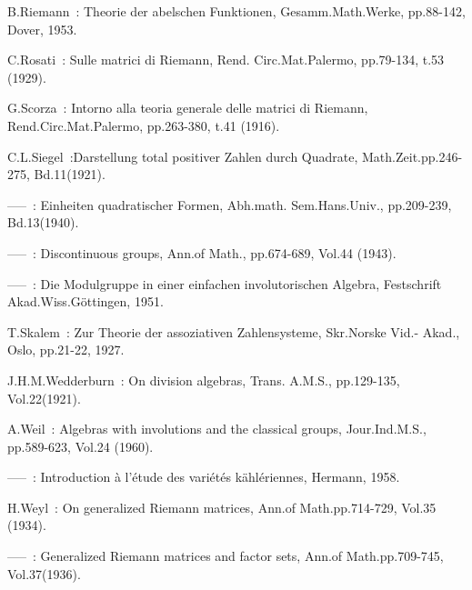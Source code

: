 \begin{thebibliography}{99}
 B.\@ Riemann~: Theorie der abelschen Funktionen,
  Gesamm.\@ Math.\@ Werke, pp.88-142, Dover, 1953.

 C.Rosati~: Sulle matrici di Riemann, Rend.\@
  Circ.\@ Mat.\@ Palermo, pp.79-134, t.53 (1929).

 G.\@ Scorza~: Intorno alla teoria generale delle
  matrici di Riemann, Rend.\@ Circ.\@ Mat.\@ Palermo, pp.263-380, t.41
  (1916). 

 C.L.\@ Siegel~:\pageoriginale Darstellung total positiver
  Zahlen durch Quadrate, Math.\@ Zeit.\@ pp.246-275, Bd.11(1921).

 -----~: Einheiten quadratischer Formen, Abh.\@ math.\@
  Sem.\@ Hans.\@ Univ., pp.209-239, Bd.\@ 13(1940).

 -----~: Discontinuous groups, Ann.\@ of Math.,
  pp.674-689, Vol.44 (1943).

 -----~: Die Modulgruppe in einer einfachen
  involutorischen Algebra, Festschrift Akad.\@ Wiss.\@ G\"ottingen,
  1951.

 T.\@ Skalem~: Zur Theorie der assoziativen Zahlensysteme,
  Skr.\@ Norske Vid.\@ - Akad., Oslo, pp.21-22, 1927.

 J.H.M.\@ Wedderburn~: On division algebras, Trans.\@
  A.M.S., pp.129-135, Vol.\@ 22(1921).

 A.\@ Weil~: Algebras with involutions and the classical
  groups, Jour.\@ Ind.\@ M.S., pp.589-623, Vol.24 (1960).

 -----~: Introduction \`a l'\'etude des vari\'et\'es
  k\"ahl\'eriennes, Hermann, 1958.

 H.\@ Weyl~: On generalized Riemann matrices,
  Ann.\@ of Math.\@ pp.714-729, Vol.\@ 35 (1934).

 -----~: Generalized Riemann matrices and factor sets,
  Ann.\@ of Math.\@ pp.709-745, Vol.37(1936). 
\end{thebibliography}
